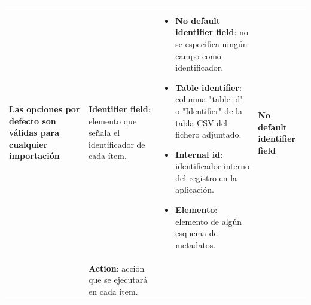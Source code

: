 \documentclass[
]{article}
\providecommand{\tightlist}{%
  \setlength{\itemsep}{0pt}\setlength{\parskip}{0pt}}
\begin{document}
\begin{longtable}[]{@{}llll@{}}
\begin{minipage}[t]{0.22\columnwidth}
\textbf{Las opciones por defecto son válidas para cualquier
importación}\strut
\end{minipage} & \begin{minipage}[t]{0.22\columnwidth}\raggedright
\textbf{Identifier field}: elemento que señala el identificador de cada
ítem.\strut
\end{minipage} & \begin{minipage}[t]{0.22\columnwidth}\raggedright
\begin{itemize}
\tightlist
\item
  \textbf{No default identifier field}: no se especifica ningún campo
  como identificador.
\item
  \textbf{Table identifier}: columna "table id" o "Identifier" de la
  tabla CSV del fichero adjuntado.
\item
  \textbf{Internal id}: identificador interno del registro en la
  aplicación.
\item
  \textbf{Elemento}: elemento de algún esquema de metadatos.
\end{itemize}\strut
\end{minipage} & \begin{minipage}[t]{0.22\columnwidth}\raggedright
\textbf{No default identifier field}\strut
\end{minipage}\tabularnewline
\begin{minipage}[t]{0.22\columnwidth}\raggedright
\strut
\end{minipage} & \begin{minipage}[t]{0.22\columnwidth}\raggedright
\textbf{Action}: acción que se ejecutará en cada ítem.


\end{minipage}
\end{longtable}
\end{document}
